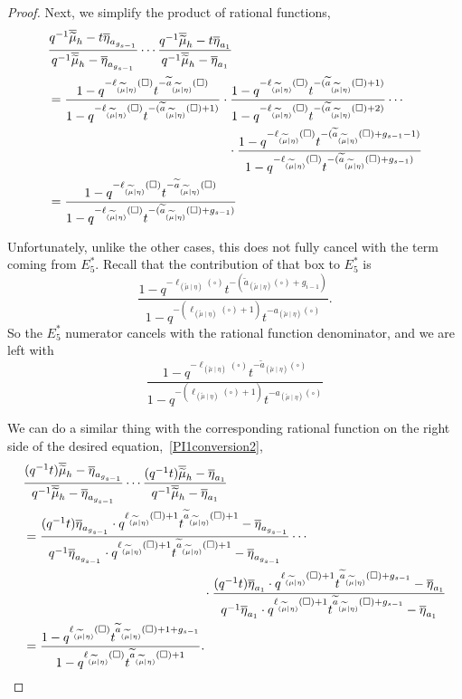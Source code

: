 \documentclass[ALCO]{cedram}
\newcommand{\mutilde}{{\widetilde{\mu}}}
\newcommand{\mutildeeta}{{(\mutilde \mid \eta)}}
\newcommand{\leg}[1]{{\ell_{#1}(\square)}}
\newcommand{\armone}[1]{{\widetilde{a}_{#1}(\square)}}
\newcommand{\armtwo}[1]{{a_{#1}(\square)}}
\newcommand{\Estarfive}{E^*_5}
\begin{document}
\begin{proof}
Next, we simplify the product of rational functions,
\begin{align*}
   &\frac{q^{-1}\overline{\mutilde}_h-t \overline{\eta}_{a_{g_{s-1}}}}{q^{-1}\overline{\mutilde}_h- \overline{\eta}_{a_{g_{s-1}}}} \dotsm \frac{q^{-1}\overline{\mutilde}_h-t \overline{\eta}_{a_1}}{q^{-1}\overline{\mutilde}_h- \overline{\eta}_{a_1}} \\
   &= \frac{1-q^{-\leg{\mutildeeta}}t^{-\armone{\mutildeeta}}}{1-q^{-\leg{\mutildeeta}}t^{-(\armone{\mutildeeta}+1)}}\cdot  \frac{1-q^{-\leg{\mutildeeta}}t^{-(\armone{\mutildeeta}+1)}}{1-q^{-\leg{\mutildeeta}}t^{-(\armone{\mutildeeta}+2)}} \dotsm \\ & \hspace*{5cm}\cdot \frac{1-q^{-\leg{\mutildeeta}}t^{-(\armone{\mutildeeta}+g_{s-1}-1)}}{1-q^{-\leg{\mutildeeta}}t^{-(\armone{\mutildeeta}+g_{s-1})}} \\
   &= \frac{1-q^{-\leg{\mutildeeta}}t^{-\armone{\mutildeeta}}}{1-q^{-\leg{\mutildeeta}}t^{-(\armone{\mutildeeta}+g_{s-1})}} 
\end{align*}

Unfortunately, unlike the other cases, this does not fully cancel with the term coming from $\Estarfive$. Recall that the contribution of that box to $\Estarfive$ is
\[ \frac{1-q^{-\leg{\mutildeeta}}t^{-(\armone{\mutildeeta}+g_{i-1})}}{1-q^{-(\leg{\mutildeeta}+1)}t^{-\armtwo{\mutildeeta}}}.\]
So the $\Estarfive$ numerator cancels with the rational function denominator, and we are left with
\[ \frac{1-q^{-\leg{\mutildeeta}}t^{-\armone{\mutildeeta}}}{1-q^{-(\leg{\mutildeeta}+1)}t^{-\armtwo{\mutildeeta}}}\]

We can do a similar thing with the corresponding rational function on the right side of the desired  equation,~\eqref{PI1conversion2},
\begin{align*}
    &\frac{(q^{-1}t)\overline{\mutilde}_h- \overline{\eta}_{a_{g_{s-1}}}}{q^{-1}\overline{\mutilde}_h- \overline{\eta}_{a_{g_{s-1}}}} \dotsm \frac{(q^{-1}t)\overline{\mutilde}_h- \overline{\eta}_{a_1}}{q^{-1}\overline{\mutilde}_h- \overline{\eta}_{a_1}} \\
    &=\frac{(q^{-1}t)\overline{\eta}_{a_{g_{s-1}}} \cdot q^{\leg{\mutildeeta}+1}t^{\armone{\mutildeeta}+1}- \overline{\eta}_{a_{g_{s-1}}}}{q^{-1}\overline{\eta}_{a_{g_{s-1}}} \cdot q^{\leg{\mutildeeta}+1}t^{\armone{\mutildeeta}+1}- \overline{\eta}_{a_{g_{s-1}}}} \dotsm \\
    &\hspace*{5cm} \cdot \frac{(q^{-1}t)\overline{\eta}_{a_1} \cdot q^{\leg{\mutildeeta}+1}t^{\armone{\mutildeeta}+g_{s-1}}- \overline{\eta}_{a_1}}{q^{-1}\overline{\eta}_{a_1} \cdot q^{\leg{\mutildeeta}+1}t^{\armone{\mutildeeta}+g_{s-1}}- \overline{\eta}_{a_1}} \\
    &= \frac{1-q^\leg{\mutildeeta}t^{\armone{\mutildeeta}+1+g_{s-1}}}{1-q^\leg{\mutildeeta}t^{\armone{\mutildeeta}+1}}.
\end{align*}


\end{proof}
\end{document}
